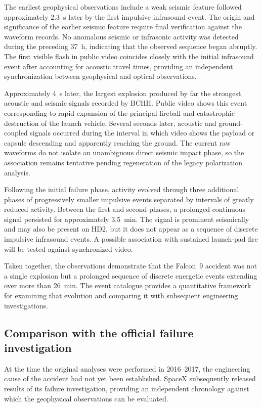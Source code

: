 \documentclass[]{seismica}
\begin{document}
The earliest geophysical observations include a weak seismic feature followed approximately 2.3~s later by the first impulsive infrasound event. The origin and significance of the earlier seismic feature require final verification against the waveform records. No anomalous seismic or infrasonic activity was detected during the preceding 37~h, indicating that the observed sequence began abruptly. The first visible flash in public video coincides closely with the initial infrasound event after accounting for acoustic travel times, providing an independent synchronization between geophysical and optical observations.

Approximately 4~s later, the largest explosion produced by far the strongest acoustic and seismic signals recorded by BCHH. Public video shows this event corresponding to rapid expansion of the principal fireball and catastrophic destruction of the launch vehicle. Several seconds later, acoustic and ground-coupled signals occurred during
the interval in which video shows the payload or capsule descending and
apparently reaching the ground. The current raw waveforms do not isolate an
unambiguous direct seismic impact phase, so the association remains tentative
pending regeneration of the legacy polarization analysis.

Following the initial failure phase, activity evolved through three
additional phases of progressively smaller impulsive events separated by
intervals of greatly reduced activity. Between the first and second phases, a
prolonged continuous signal persisted for approximately 3.5~min. The signal is
prominent seismically and may also be present on HD2, but it does not appear as
a sequence of discrete impulsive infrasound events. A possible association with
sustained launch-pad fire will be tested against synchronized video.

Taken together, the observations demonstrate that the Falcon~9 accident was not a single explosion but a prolonged sequence of discrete energetic events extending over more than 26~min. The event catalogue provides a quantitative framework for examining that evolution and comparing it with subsequent engineering investigations.

\subsection{Comparison with the official failure investigation}
\label{sec:discussion_investigation}

At the time the original analyses were performed in 2016--2017, the engineering cause of the accident had not yet been established. SpaceX subsequently released results of its failure investigation, providing an independent chronology against which the geophysical observations can be evaluated.
\end{document}
